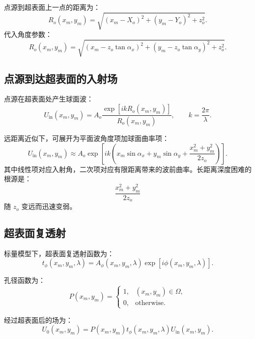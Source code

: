 \documentclass[11pt,a4paper,fontset=none]{ctexart}
\begin{document}
点源到超表面上一点的距离为：
\begin{equation}
  R_o(x_m,y_m)
  =
  \sqrt{
  (x_m-X_o)^2+
  (y_m-Y_o)^2+
  z_o^2
  }.
\end{equation}
代入角度参数：
\begin{equation}
  R_o(x_m,y_m)
  =
  \sqrt{
  (x_m-z_o\tan\alpha_x)^2+
  (y_m-z_o\tan\alpha_y)^2+
  z_o^2
  }.
\end{equation}

\subsection{点源到达超表面的入射场}

点源在超表面处产生球面波：
\begin{equation}
  U_{\mathrm{in}}(x_m,y_m)
  =
  A_o
  \frac{
  \exp\left[i k R_o(x_m,y_m)\right]
  }{
  R_o(x_m,y_m)
  },
  \qquad k=\frac{2\pi}{\lambda}.
\end{equation}

远距离近似下，可展开为平面波角度项加球面曲率项：
\begin{equation}
  U_{\mathrm{in}}(x_m,y_m)
  \approx
  A_o
  \exp
  \left[
  ik
  \left(
  x_m\sin\alpha_x+
  y_m\sin\alpha_y+
  \frac{x_m^2+y_m^2}{2z_o}
  \right)
  \right].
\end{equation}
其中线性项对应入射角，二次项对应有限距离带来的波前曲率。长距离深度困难的根源是：
\begin{equation}
  \frac{x_m^2+y_m^2}{2z_o}
\end{equation}
随 $z_o$ 变远而迅速变弱。

\subsection{超表面复透射}

标量模型下，超表面复透射函数为：
\begin{equation}
  t_\phi(x_m,y_m,\lambda)
  =
  A_\phi(x_m,y_m,\lambda)
  \exp[i\phi(x_m,y_m,\lambda)].
\end{equation}

孔径函数为：
\begin{equation}
  P(x_m,y_m)=
  \begin{cases}
  1,&(x_m,y_m)\in\Omega,\\
  0,&\text{otherwise}.
  \end{cases}
\end{equation}

经过超表面后的场为：
\begin{equation}
  U_0(x_m,y_m)
  =
  P(x_m,y_m)
  t_\phi(x_m,y_m,\lambda)
  U_{\mathrm{in}}(x_m,y_m).
\end{equation}
\end{document}
